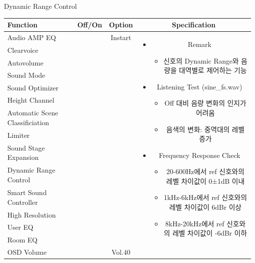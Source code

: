 \documentclass{beamer}
\begin{document}
\begin{frame}[t]{Dynamic Range Control}
\begin{tiny}
\begin{tabular}{@{}lccc@{}}
\toprule
Function & Off/On & Option & Specification \\
\midrule
Audio AMP EQ & \color{black}{Off} & Instart &
\multirow{14}{60mm}{
\begin{itemize}
\item Remark
	\begin{itemize}
	\item 신호의 Dynamic Range와 음량을 대역별로 제어하는 기능
	\end{itemize}
\item Listening Test (sine\_fs.wav)
	\begin{itemize}
	\item Off 대비 음량 변화의 인지가 어려움
	\item 음색의 변화: 중역대의 레벨 증가
	\end{itemize}
\item Frequency Response Check
  \begin{itemize}
  \item 20-600Hz에서 ref 신호와의 레벨 차이값이 0±1dB 이내
  \item 1kHz-6kHz에서 ref 신호와의 레벨 차이값이 6dBr 이상
  \item 8kHz-20kHz에서 ref 신호와의 레벨 차이값이 -6dBr 이하
  \end{itemize}
\end{itemize}
} \\
Clearvoice & \color{black}{Off} & & \\
Autovolume & \color{black}{Off} & & \\
Sound Mode & \color{black}{Off} & & \\
Sound Optimizer & \color{black}{Off} & & \\
Height Channel & \color{black}{Off} & & \\
Automatic Scene Classificiation & \color{black}{Off} & & \\
Limiter & \color{black}{Off} & & \\
Sound Stage Expansion & \color{black}{Off} & & \\
Dynamic Range Control & \color{blue}{On} & & \\
Smart Sound Controller & \color{black}{Off} & & \\
High Resolution & \color{black}{Off} & & \\
User EQ & \color{black}{Off} & & \\
Room EQ & \color{black}{Off} & & \\
OSD Volume & \color{blue}{On} & Vol.40 & \\
\midrule
\end{tabular}
\end{tiny}


\end{frame}
\end{document}
